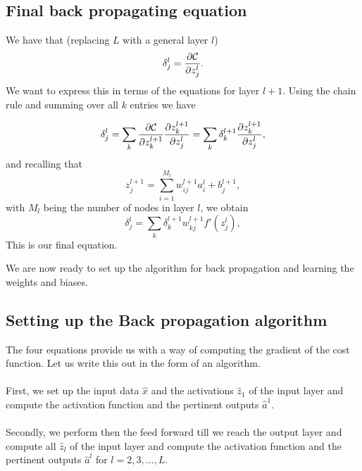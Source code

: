 \documentclass[%
oneside,                 %
final,                   %
10pt]{article}
\begin{document}
\subsection{Final back propagating equation}

We have that (replacing $L$ with a general layer $l$)
\[
\delta_j^l =\frac{\partial {\cal C}}{\partial z_j^l}.
\]
We want to express this in terms of the equations for layer $l+1$. Using the chain rule and summing over all $k$ entries we have

\[
\delta_j^l =\sum_k \frac{\partial {\cal C}}{\partial z_k^{l+1}}\frac{\partial z_k^{l+1}}{\partial z_j^{l}}=\sum_k \delta_k^{l+1}\frac{\partial z_k^{l+1}}{\partial z_j^{l}},
\]
and recalling that
\[
z_j^{l+1} = \sum_{i=1}^{M_{l}}w_{ij}^{l+1}a_i^{l}+b_j^{l+1},
\]
with $M_l$ being the number of nodes in layer $l$, we obtain
\[
\delta_j^l =\sum_k \delta_k^{l+1}w_{kj}^{l+1}f'(z_j^l),
\]
This is our final equation.

We are now ready to set up the algorithm for back propagation and learning the weights and biases.

\subsection{Setting up the Back propagation algorithm}

The four equations  provide us with a way of computing the gradient of the cost function. Let us write this out in the form of an algorithm.


\paragraph{}
First, we set up the input data $\hat{x}$ and the activations
$\hat{z}_1$ of the input layer and compute the activation function and
the pertinent outputs $\hat{a}^1$.




\paragraph{}
Secondly, we perform then the feed forward till we reach the output
layer and compute all $\hat{z}_l$ of the input layer and compute the
activation function and the pertinent outputs $\hat{a}^l$ for
$l=2,3,\dots,L$.




\end{document}
